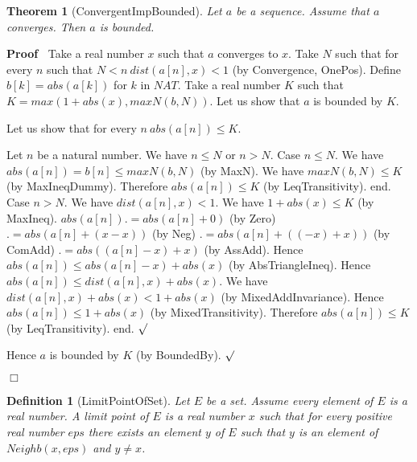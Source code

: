 \documentclass{article}
\newenvironment{forthel}{\begin{leftbar}}{\end{leftbar}}
\newenvironment{proof}{\noindent\textbf{Proof\ }}{\hspace*{\fill}$\Box$\medskip}
\newenvironment{subproof}{\begin{list}{}{}
		\item[\text{Proof}]}{\hfill $\surd$ \end{list}}
\newtheorem{theorem}{Theorem}
\newtheorem{definition}{Definition}
\begin{document}
\begin{forthel}
	\begin{theorem}[ConvergentImpBounded]
	Let $a$ be a sequence. Assume that $a$ converges. Then $a$ is bounded.
	\end{theorem}
	\begin{proof}
	Take a real number $x$ such that $a$ converges to $x$.
	Take $N$ such that for every $n$ such that $N < n \ dist(a[n],x) < 1$ (by Convergence, OnePos).
	Define $b[k] = abs(a[k])$ for $k$ in $NAT$.
	Take a real number $K$ such that $K = max(1 + abs(x), maxN(b,N))$.
	Let us show that $a$ is bounded by $K$.
	\begin{subproof}
	Let us show that for every $n \ abs(a[n]) \leq K$.
	\begin{subproof} 
	Let $n$ be a natural number.
	We have $n \leq N$ or $n > N$.
	Case $n \leq N$.
	We have $abs(a[n]) = b[n] \leq maxN(b,N)$ (by MaxN).
	We have $maxN(b,N) \leq K$ (by MaxIneqDummy).
	Therefore $abs(a[n]) \leq K$ (by LeqTransitivity).
	end.
	Case $n > N$.
	We have $dist(a[n],x) < 1$.
	We have $1 + abs(x) \leq K$ (by MaxIneq).
	$abs(a[n]) .= abs(a[n] + 0)$ (by Zero)
	$.= abs(a[n] + (x - x))$ (by Neg)
	$.= abs(a[n] + ((-x) + x))$ (by ComAdd)
	$.= abs((a[n] - x) + x)$ (by AssAdd).
	Hence $abs(a[n]) \leq abs(a[n] - x) + abs(x)$ (by AbsTriangleIneq).
	Hence $abs(a[n]) \leq dist(a[n],x) + abs(x)$.
	We have $dist(a[n],x) + abs(x) < 1 + abs(x)$ (by MixedAddInvariance).
	Hence $abs(a[n]) \leq 1 + abs(x)$ (by MixedTransitivity).
	Therefore $abs(a[n]) \leq K$ (by LeqTransitivity).
	end.
	\end{subproof}
	Hence $a$ is bounded by $K$ (by BoundedBy).
	\end{subproof}
	\end{proof}
	
	\begin{definition}[LimitPointOfSet]
	Let $E$ be a set. Assume every element of $E$ is a real number. A limit point of $E$
	is a real number $x$ such that for every positive real number $eps$ there exists an element
	$y$ of $E$ such that $y$ is an element of $Neighb(x,eps)$ and $y \neq x$.
	\end{definition}
	

\end{forthel}
\end{document}
